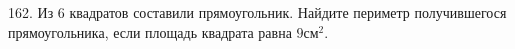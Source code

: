 162. Из 6 квадратов составили прямоугольник. Найдите периметр получившегося прямоугольника, если площадь квадрата равна $9\text{см}^2.$\\
